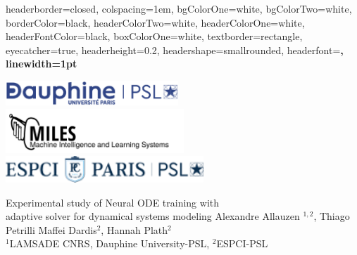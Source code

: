 \documentclass[landscape,a0paper,fontscale=0.285]{baposter} %
\begin{document}
\begin{poster}
{
headerborder=closed, %
colspacing=1em, %
bgColorOne=white, %
bgColorTwo=white, %
borderColor=black, %
headerColorTwo=white, %
headerColorOne=white, %
headerFontColor=black, %
boxColorOne=white, %
textborder=rectangle, %
eyecatcher=true, %
headerheight=0.2\textheight, %
headershape=smallrounded, %
headerfont=\Large\bf\textsc, %
linewidth=1pt %
}
%
{
  \begin{minipage}{0.2\textwidth}
    \includegraphics[height=2.5em]{dauphine}\\
    \includegraphics[height=4.5em]{logomiles_white}\\[1ex]
    \includegraphics[height=2.7em]{espci}%
  \end{minipage}
}
{{\color{bleutitre}Experimental study of Neural ODE training with\\[0.5ex] adaptive solver
  for dynamical systems modeling}\vspace{1ex}} %
{  Alexandre Allauzen $^{1,2}$, Thiago Petrilli Maffei Dardis$^{2}$, Hannah Plath$^{2}$\\
  $^{1}$LAMSADE CNRS, Dauphine University-PSL, $^{2}$ESPCI-PSL
} %
{} %





\end{poster}
\end{document}
